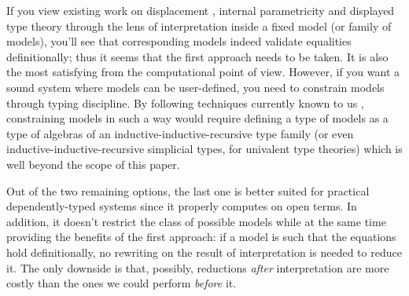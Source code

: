 If you view existing work on displacement
\cite{McBride:Crude2011, McBride:Crude2012}, internal
parametricity \cite{Altenkirch:Parametricity2024} and
displayed type theory \cite{Kolomatskaia_Shulman_2025}
through the lens of interpretation inside a fixed
model (or family of models), you'll see that
corresponding models indeed validate equalities
definitionally; thus it seems that the first approach
needs to be taken. It is also the most satisfying from
the computational point of view. However, if you want a
sound system where models can be user-defined, you need
to constrain models through typing discipline. By
following techniques currently known to us
\cite{bezem2021notegeneralizedalgebraictheories},
constraining models in such a way would require
defining a type of models as a type of algebras of an
inductive-inductive-recursive type family (or even
inductive-inductive-recursive simplicial types, for
univalent type theories) which is well beyond the scope
of this paper.

Out of the two remaining options, the last one is better
suited for practical dependently-typed systems since it
properly computes on open terms. In addition, it doesn't
restrict the class of possible models while at the same
time providing the benefits of the first approach: if
a model is such that the equations hold definitionally,
no rewriting on the result of interpretation is needed
to reduce it. The only downside is that, possibly,
reductions \textit{after} interpretation are more costly
than the ones we could perform \textit{before} it.
